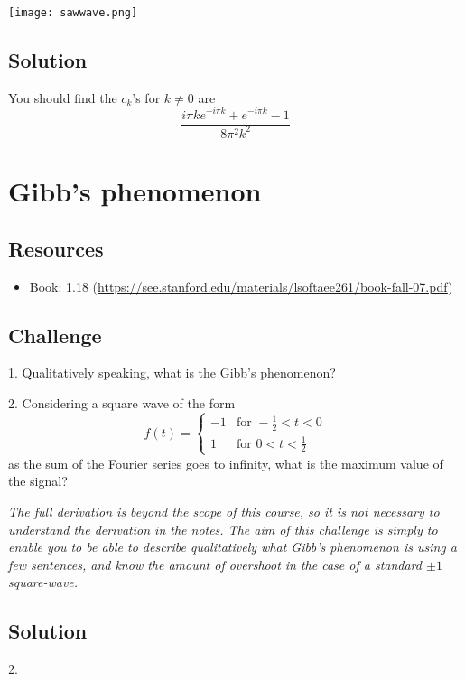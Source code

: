 \texttt{[image: sawwave.png]}

\subsection*{Solution}
You should find the $c_k$'s for $k \ne 0$ are
\begin{equation}
    \frac{i \pi k e^{-i \pi k} + e^{-i \pi k} - 1}{8 \pi^2 k^2}
\end{equation}



\newpage
\section{Gibb's phenomenon}

\subsection*{Resources}
\begin{itemize}
    \item Book: 1.18 (\url{https://see.stanford.edu/materials/lsoftaee261/book-fall-07.pdf})
\end{itemize}

\subsection*{Challenge}
1. Qualitatively speaking, what is the Gibb's phenomenon?

2. Considering a square wave of the form
\begin{equation}
    f(t)=
    \begin{cases}
        -1 & \text{for } -\frac{1}{2} < t < 0 \\
        1 & \text{for } 0 < t < \frac{1}{2}
    \end{cases}
\end{equation}
as the sum of the Fourier series goes to infinity, what is the maximum value of the signal?

\emph{The full derivation is beyond the scope of this course, so it is not necessary to understand the derivation in the notes. The aim of this challenge is simply to enable you to be able to describe qualitatively what Gibb's phenomenon is using a few sentences, and know the amount of overshoot in the case of a standard $\pm 1$ square-wave.}

\subsection*{Solution}
2.\\




